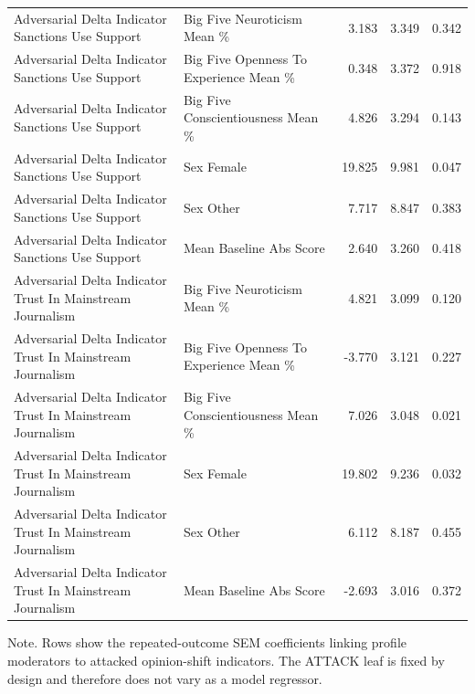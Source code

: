 \begin{table}[htbp]
\begin{threeparttable}
\begin{tabular}{llrrr}
Adversarial Delta Indicator Sanctions Use Support & Big Five Neuroticism Mean \% & 3.183 & 3.349 & 0.342 \\
Adversarial Delta Indicator Sanctions Use Support & Big Five Openness To Experience Mean \% & 0.348 & 3.372 & 0.918 \\
Adversarial Delta Indicator Sanctions Use Support & Big Five Conscientiousness Mean \% & 4.826 & 3.294 & 0.143 \\
Adversarial Delta Indicator Sanctions Use Support & Sex Female & 19.825 & 9.981 & 0.047 \\
Adversarial Delta Indicator Sanctions Use Support & Sex Other & 7.717 & 8.847 & 0.383 \\
Adversarial Delta Indicator Sanctions Use Support & Mean Baseline Abs Score & 2.640 & 3.260 & 0.418 \\
Adversarial Delta Indicator Trust In Mainstream Journalism & Big Five Neuroticism Mean \% & 4.821 & 3.099 & 0.120 \\
Adversarial Delta Indicator Trust In Mainstream Journalism & Big Five Openness To Experience Mean \% & -3.770 & 3.121 & 0.227 \\
Adversarial Delta Indicator Trust In Mainstream Journalism & Big Five Conscientiousness Mean \% & 7.026 & 3.048 & 0.021 \\
Adversarial Delta Indicator Trust In Mainstream Journalism & Sex Female & 19.802 & 9.236 & 0.032 \\
Adversarial Delta Indicator Trust In Mainstream Journalism & Sex Other & 6.112 & 8.187 & 0.455 \\
Adversarial Delta Indicator Trust In Mainstream Journalism & Mean Baseline Abs Score & -2.693 & 3.016 & 0.372 \\
\bottomrule
\end{tabular}
\begin{tablenotes}[flushleft]
\footnotesize
\item Note. Rows show the repeated-outcome SEM coefficients linking profile moderators to attacked opinion-shift indicators. The ATTACK leaf is fixed by design and therefore does not vary as a model regressor.
\end{tablenotes}
\end{threeparttable}
\end{table}